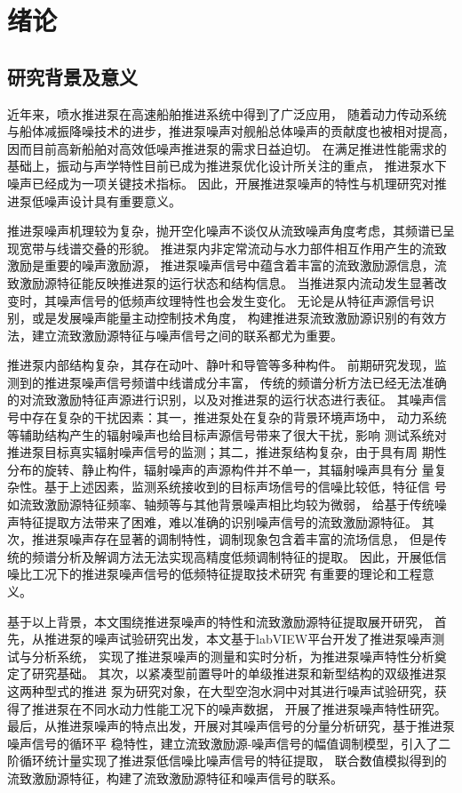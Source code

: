 \chapter{绪论}

\section{研究背景及意义}
近年来，喷水推进泵在高速船舶推进系统中得到了广泛应用，
随着动力传动系统与船体减振降噪技术的进步，推进泵噪声对舰船总体噪声的贡献度也被相对提高，
因而目前高新船舶对高效低噪声推进泵的需求日益迫切。
在满足推进性能需求的基础上，振动与声学特性目前已成为推进泵优化设计所关注的重点，
推进泵水下噪声已经成为一项关键技术指标。
因此，开展推进泵噪声的特性与机理研究对推进泵低噪声设计具有重要意义。

推进泵噪声机理较为复杂，抛开空化噪声不谈仅从流致噪声角度考虑，其频谱已呈现宽带与线谱交叠的形貌。
推进泵内非定常流动与水力部件相互作用产生的流致激励是重要的噪声激励源，
推进泵噪声信号中蕴含着丰富的流致激励源信息，流致激励源特征能反映推进泵的运行状态和结构信息。
当推进泵内流动发生显著改变时，其噪声信号的低频声纹理特性也会发生变化。
无论是从特征声源信号识别，或是发展噪声能量主动控制技术角度，
构建推进泵流致激励源识别的有效方法，建立流致激励源特征与噪声信号之间的联系都尤为重要。

推进泵内部结构复杂，其存在动叶、静叶和导管等多种构件。
前期研究发现，监测到的推进泵噪声信号频谱中线谱成分丰富，
传统的频谱分析方法已经无法准确的对流致激励特征声源进行识别，以及对推进泵的运行状态进行表征。
其噪声信号中存在复杂的干扰因素：其一，推进泵处在复杂的背景环境声场中，
动力系统等辅助结构产生的辐射噪声也给目标声源信号带来了很大干扰，影响
测试系统对推进泵目标真实辐射噪声信号的监测；其二，推进泵结构复杂，由于具有周
期性分布的旋转、静止构件，辐射噪声的声源构件并不单一，其辐射噪声具有分
量复杂性。基于上述因素，监测系统接收到的目标声场信号的信噪比较低，特征信
号如流致激励源特征频率、轴频等与其他背景噪声相比均较为微弱，
给基于传统噪声特征提取方法带来了困难，难以准确的识别噪声信号的流致激励源特征。
其次，推进泵噪声存在显著的调制特性，调制现象包含着丰富的流场信息，
但是传统的频谱分析及解调方法无法实现高精度低频调制特征的提取。
因此，开展低信噪比工况下的推进泵噪声信号的低频特征提取技术研究
有重要的理论和工程意义。

基于以上背景，本文围绕推进泵噪声的特性和流致激励源特征提取展开研究，
首先，从推进泵的噪声试验研究出发，本文基于labVIEW平台开发了推进泵噪声测试与分析系统，
实现了推进泵噪声的测量和实时分析，为推进泵噪声特性分析奠定了研究基础。 
其次，以紧凑型前置导叶的单级推进泵和新型结构的双级推进泵这两种型式的推进
泵为研究对象，在大型空泡水洞中对其进行噪声试验研究，获得了推进泵在不同水动力性能工况下的噪声数据，
开展了推进泵噪声特性研究。
最后，从推进泵噪声的特点出发，开展对其噪声信号的分量分析研究，基于推进泵噪声信号的循环平
稳特性，建立流致激励源­-噪声信号的幅值调制模型，引入了二阶循环统计量实现了推进泵低信噪比噪声信号的特征提取，
联合数值模拟得到的流致激励源特征，构建了流致激励源特征和噪声信号的联系。

